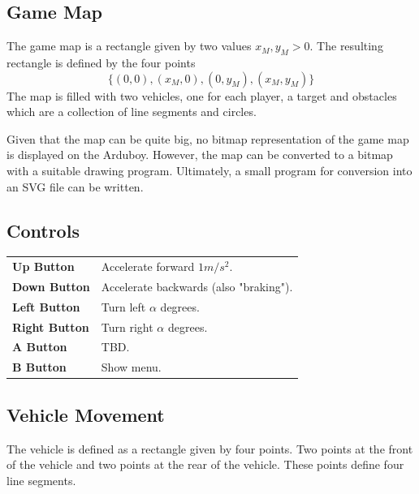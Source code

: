 \documentclass[11pt]{article}
\begin{document}
\subsection{Game Map}
\label{sec-game-map}
The game map is a rectangle given by two values $x_M, y_M > 0$. The resulting
rectangle is defined by the four points
\begin{equation*}
    \{(0,0), (x_M, 0), (0, y_M), (x_M, y_M)\}
\end{equation*}
The map is filled with two vehicles, one for each player, a target and
obstacles which are a collection of line segments and circles.

Given that the map can be quite big, no bitmap representation of the game map
is displayed on the Arduboy. However, the map can be converted to a bitmap
with a suitable drawing program. Ultimately, a small program for conversion
into an SVG file can be written.

\subsection{Controls}
\label{sec-controls}

\begin{tabular}{>{\sffamily\bfseries}ll}
    Up Button & Accelerate forward $1m/s^2$. \\
    Down Button & Accelerate backwards (also "braking").\\
    Left Button & Turn left $\alpha$ degrees.\\
    Right Button & Turn right $\alpha$ degrees.\\
    A Button & TBD.\\
    B Button & Show menu.\\
\end{tabular}

\subsection{Vehicle Movement}
\label{sec-vehicle-movement}

The vehicle is defined as a rectangle given by four points. Two points at the
front of the vehicle and two points at the rear of the vehicle. These points
define four line segments.
\end{document}
